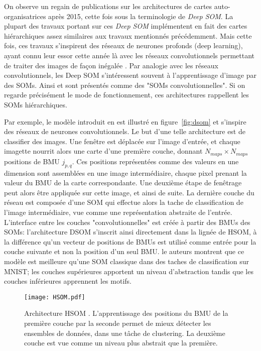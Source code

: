 \documentclass[../main]{subfiles}
\begin{document}
On observe un regain de publications sur les architectures de cartes auto-organisatrices après 2015, cette fois sous la terminologie de \emph{Deep SOM}.
La plupart des travaux portant sur ces \emph{Deep SOM} implémentent en fait des cartes hiérarchiques assez similaires aux travaux mentionnés précédemment. 
Mais cette fois, ces travaux s'inspirent des réseaux de neurones profonds (deep learning), ayant connu leur essor cette année là avec les réseaux convolutionnels permettant de traiter des images de façon inégalée \cite{lecun_deep_2015}.
Par analogie avec les réseaux convolutionnels, les Deep SOM s'intéressent souvent à l'apprentissage d'image par des SOMs. Ainsi \cite{Liu2015DeepSM,hankins_somnet_2018,wickramasinghe_deep_2019,aly_deep_2020,sakkari_convolutional_2020,dozono_convolutional_2016,nawaratne_hierarchical_2020-1,mici_self-organizing_2018} et sont présentés comme des "SOMs convolutionnelles". Si on regarde précisément le mode de fonctionnement, ces architectures rappellent les SOMs hiérarchiques.


Par exemple, le modèle introduit en \cite{Liu2015DeepSM} est illustré en figure~\ref{fig:dsom} et s'inspire des réseaux de neurones convolutionnels.
Le but d'une telle architecture est de classifier des images. Une fenêtre est déplacée sur l'image d'entrée, et chaque imagette nourrit alors une carte d'une première couche, donnant $N_{maps}  \times N_{maps}$ positions de BMU $j_{p,q}$. Ces positions représentées comme des valeurs en une dimension sont assemblées en une image intermédiaire, chaque pixel prenant la valeur du BMU de la carte correspondante. Une deuxième étape de fenêtrage peut alors être appliquée sur cette image, et ainsi de suite. La dernière couche du réseau est composée d'une SOM qui effectue alors la tache de classification de l'image intermédiaire, vue comme une représentation abstraite  de l'entrée.
L'interface entre les couches "convolutionnelles" est créée à partir des BMUs des SOMs: l'architecture DSOM s'inscrit ainsi directement dans la lignée de HSOM, à la différence qu'un vecteur de positions de BMUs est utilisé comme entrée pour la couche suivante et non la position d'un seul BMU.
le auteurs montrent que ce modèle est meilleure qu'une SOM classique dans des taches de classification sur MNIST; les couches supérieures apportent un niveau d'abstraction tandis que les couches inférieures apprennent les motifs.


\begin{figure}
    \centering
    \texttt{[image: HSOM.pdf]}
    \caption{Architecture HSOM \cite{lampinen_clustering_1992}. L'apprentissage des positions du BMU de la première couche par la seconde permet de mieux détecter les ensembles de données, dans une tâche de clustering. La deuxième couche est vue comme un niveau plus abstrait que la première. \label{fig:hsom}}
\end{figure}
\end{document}
